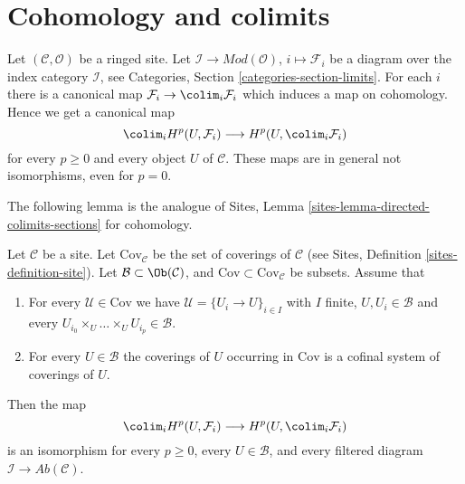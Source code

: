 \section{Cohomology and colimits}
\label{section-limits}

\noindent
Let $(\mathcal{C}, \mathcal{O})$ be a ringed site.
Let $\mathcal{I} \to \textit{Mod}(\mathcal{O})$, $i \mapsto \mathcal{F}_i$
be a diagram over the index category $\mathcal{I}$, see
Categories, Section \ref{categories-section-limits}.
For each $i$ there is a canonical map
$\mathcal{F}_i \to \colim_i \mathcal{F}_i$ which induces
a map on cohomology. Hence we get a canonical map
$$
\colim_i H^p(U, \mathcal{F}_i)
\longrightarrow
H^p(U, \colim_i \mathcal{F}_i)
$$
for every $p \geq 0$ and every object $U$ of $\mathcal{C}$.
These maps are in general not isomorphisms, even for $p = 0$.

\medskip\noindent
The following lemma is the analogue of
Sites, Lemma \ref{sites-lemma-directed-colimits-sections}
for cohomology.

\begin{lemma}
\label{lemma-colim-works-over-collection}
Let $\mathcal{C}$ be a site. Let $\text{Cov}_\mathcal{C}$ be the set
of coverings of $\mathcal{C}$ (see
Sites, Definition \ref{sites-definition-site}). Let
$\mathcal{B} \subset \Ob(\mathcal{C})$, and
$\text{Cov} \subset \text{Cov}_\mathcal{C}$
be subsets. Assume that
\begin{enumerate}
\item For every $\mathcal{U} \in \text{Cov}$ we have
$\mathcal{U} = \{U_i \to U\}_{i \in I}$ with $I$ finite,
$U, U_i \in \mathcal{B}$ and every
$U_{i_0} \times_U \ldots \times_U U_{i_p} \in \mathcal{B}$.
\item For every $U \in \mathcal{B}$ the coverings of $U$
occurring in $\text{Cov}$ is a cofinal system of coverings of $U$.
\end{enumerate}
Then the map
$$
\colim_i H^p(U, \mathcal{F}_i)
\longrightarrow
H^p(U, \colim_i \mathcal{F}_i)
$$
is an isomorphism for every $p \geq 0$, every $U \in \mathcal{B}$, and
every filtered diagram $\mathcal{I} \to \textit{Ab}(\mathcal{C})$.
\end{lemma}

